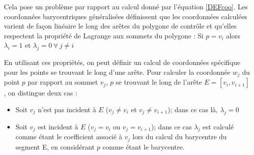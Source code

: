 Cela pose un problème par rapport au calcul donné par l'équation \ref{DEFcoo}.
Les coordonnées barycentriques généralisées définissent que les coordonnées
calculées varient de façon linéaire le long des arêtes du polygone de contrôle
et qu'elles respectent la propriété de Lagrange aux sommets du polygone : Si $p
= v_i$ alors $\lambda_i = 1$ et $\lambda_j = 0 ~\forall~ j \neq i$ 

En utilisant ces propriétés, on peut définir un calcul de coordonnées spécifique
pour les points se trouvant le long d'une arête. Pour calculer la coordonnée
$w_j$ du point $p$ par rapport au sommet $v_j$, $p$ se trouvant le long de
l'arête $E = [v_i,v_{i+1}]$, on distingue deux cas :

\begin{itemize}
\item Soit $v_j$ n'est pas incident à $E$ ($v_j \neq v_i$ et $v_j \neq
v_{i+1}$); dans ce cas là, $\lambda_j = 0$
\item Soit $v_j$ est incident à $E$ ($v_j = v_i$ ou $v_j = v_{i+1}$); dans ce
cas $\lambda_j$ est calculé comme étant le coefficient associé à $v_j$ lors du calcul
du barycentre du segment E, en considérant $p$ comme étant le barycentre.
\end{itemize}
